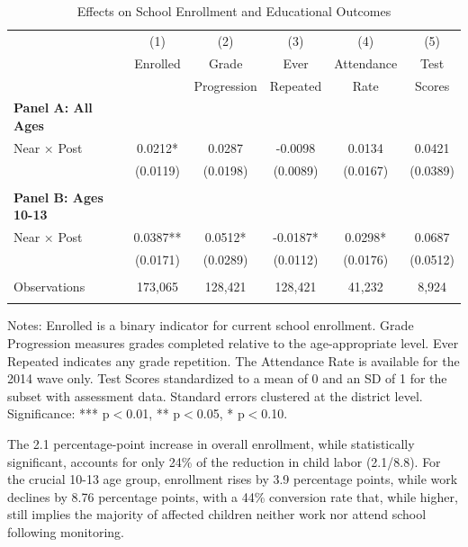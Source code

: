 \documentclass[12pt]{article}
\begin{document}
\begin{table}[H]
\centering
\caption{Effects on School Enrollment and Educational Outcomes}
\label{tab:schooling}
\begin{threeparttable}
\begin{tabular}{lccccc}
\toprule
& (1) & (2) & (3) & (4) & (5) \\
& Enrolled & Grade & Ever & Attendance & Test \\
& & Progression & Repeated & Rate & Scores \\
\midrule
\textbf{Panel A: All Ages} & & & & & \\
Near × Post & 0.0212* & 0.0287 & -0.0098 & 0.0134 & 0.0421 \\
& (0.0119) & (0.0198) & (0.0089) & (0.0167) & (0.0389) \\
& & & & & \\
\textbf{Panel B: Ages 10-13} & & & & & \\
Near × Post & 0.0387** & 0.0512* & -0.0187* & 0.0298* & 0.0687 \\
& (0.0171) & (0.0289) & (0.0112) & (0.0176) & (0.0512) \\
& & & & & \\
Observations & 173,065 & 128,421 & 128,421 & 41,232 & 8,924 \\
\\
\bottomrule
\end{tabular}
\begin{tablenotes}
\footnotesize
\item Notes: Enrolled is a binary indicator for current school enrollment. Grade Progression measures grades completed relative to the age-appropriate level. Ever Repeated indicates any grade repetition. The Attendance Rate is available for the 2014 wave only. Test Scores standardized to a mean of 0 and an SD of 1 for the subset with assessment data. Standard errors clustered at the district level. Significance: *** p$<$0.01, ** p$<$0.05, * p$<$0.10.
\end{tablenotes}
\end{threeparttable}
\end{table}

The 2.1 percentage-point increase in overall enrollment, while statistically significant, accounts for only 24\% of the reduction in child labor (2.1/8.8). For the crucial 10-13 age group, enrollment rises by 3.9 percentage points, while work declines by 8.76 percentage points, with a 44\% conversion rate that, while higher, still implies the majority of affected children neither work nor attend school following monitoring.
\end{document}
